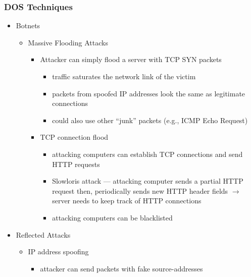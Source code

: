 \documentclass[final]{article}
\begin{document}
\subsubsection*{DOS Techniques}
\begin{itemize}[nosep]
    \item Botnets
          \begin{itemize}[nosep]
              \item Massive Flooding Attacks
                    \begin{itemize}[nosep]
                        \item Attacker can simply flood a server with TCP SYN packets
                              \begin{itemize}[nosep]
                                  \item traffic saturates the network link of the victim
                                  \item packets from spoofed IP addresses look the same as legitimate connections
                                  \item could also use other “junk” packets (e.g., ICMP Echo Request)
                              \end{itemize}
                        \item TCP connection flood
                              \begin{itemize}[nosep]
                                  \item attacking computers can establish TCP connections and send HTTP requests
                                  \item Slowloris attack --- attacking computer sends a partial HTTP request then, periodically sends new HTTP header fields $\rightarrow$ server needs to keep track of HTTP connections
                                  \item attacking computers can be blacklisted
                              \end{itemize}
                    \end{itemize}
          \end{itemize}
    \item Reflected Attacks
          \begin{itemize}[nosep]
              \item IP address spoofing
                    \begin{itemize}[nosep]
                        \item attacker can send packets with fake source-addresses

\end{itemize}
\end{itemize}
\end{itemize}
\end{document}

